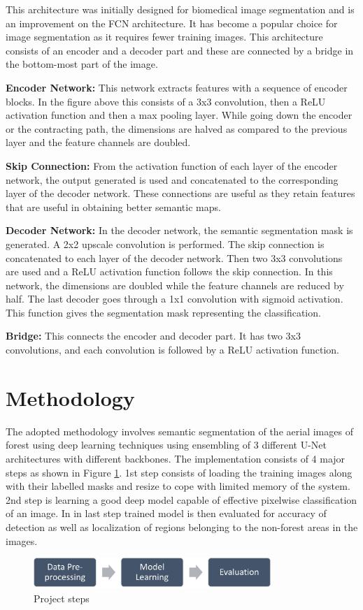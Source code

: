 \documentclass[rnd]{mas_proposal}
\begin{document}
This architecture was initially designed for biomedical image segmentation and is an improvement on the FCN architecture. \cite{u-net} It has become a popular choice for image segmentation as it requires fewer training images. 
This architecture consists of an encoder and a decoder part and these are connected by a bridge in the bottom-most part of the image. 

\textbf{Encoder Network:} This network extracts features with a sequence of encoder blocks. In the figure above this consists of a 3x3 convolution, then a ReLU activation function and then a max pooling layer. While going down the encoder or the contracting path, the dimensions are halved as compared to the previous layer and the feature channels are doubled. 

\textbf{Skip Connection:} From the activation function of each layer of the encoder network, the output generated is used and concatenated to the corresponding layer of the decoder network. These connections are useful as they retain features that are useful in obtaining better semantic maps.

\textbf{Decoder Network:} In the decoder network, the semantic segmentation mask is generated. A 2x2 upscale convolution is performed. The skip connection is concatenated to each layer of the decoder network. Then two 3x3 convolutions are used and a ReLU activation function follows the skip connection. In this network, the dimensions are doubled while the feature channels are reduced by half. 
The last decoder goes through a 1x1 convolution with sigmoid activation. This function gives the segmentation mask representing the classification.

\textbf{Bridge:} This connects the encoder and decoder part. It has two 3x3 convolutions, and each convolution is followed by a ReLU activation function.

\newpage
\section{Methodology}


The adopted methodology involves semantic segmentation of the aerial images of forest using deep learning techniques 
using ensembling of 3 different U-Net architectures with different backbones. The implementation consists of 4 major steps as shown in Figure \ref{fig:steps}. 
1st step consists of loading the training images along with their labelled masks and resize to cope with limited memory of the system.  2nd step is learning a 
good deep model capable of effective pixelwise classification of an image. In in last step trained model is then evaluated for accuracy of detection as well 
as localization of regions belonging to the non-forest areas in the images. 
\begin{figure}[htp] 
        \centering
        \includegraphics[width=0.8\textwidth]{images/fig3.png}
        \caption{Project steps}%
        \label{fig:steps}%
\end{figure}
\end{document}
